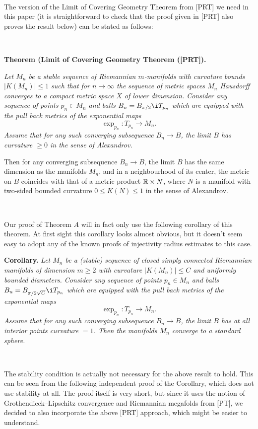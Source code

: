 \


 

The version of the Limit of Covering Geometry Theorem from [PRT] 
we need in this paper
(it is straightforward to check 
that the proof given in [PRT] also proves the result below)
can be stated as follows:
 
\ 
 
\noindent
{\bf Theorem (Limit of Covering Geometry Theorem ([PRT]).\ts} 
{\sl 
Let $M_n$ be a stable
sequence of Riemannian $m$-manifolds with curvature bounds $|K(M_n)|\le1$ such 
that for $n\to\infty$ the sequence of metric spaces $M_n$ Hausdorff converges
to 
a compact metric space $X$ of lower dimension.   
Consider any sequence of points 
$p_n\in M_n$ and balls $B_n=B_{\pi/2}\i T_{p_n}$ which are equipped with the 
pull back metrics of the exponential maps 
$$\exp_{p_n}\colon T_{p_n}\to M_n.$$   
Assume that for any such converging subsequence $B_n\to B$,  
the limit $B$ has curvature $\ge0$ in 
the sense of Alexandrov. 

Then for any converging subsequence $B_n\to B$, the limit $B$  
has the same dimension as the manifolds $M_n$, 
and in a neighbourhood of its center,  
the metric on $B$ coincides with that of 
a metric product ${\Bbb R}\times N$, where $N$ is a manifold with two-sided bounded 
curvature $0\le K(N)\le 1$ in the sense of Alexandrov. 
}

\ 

Our proof of Theorem $A$ will in fact only use the following corollary
of this theorem. At first sight this corollary looks almost obvious,
but it doesn't seem easy to adopt
any of the known proofs of injectivity radius estimates to this case.



\noindent
{\bf Corollary.\ts} 
{\sl Let $M_n$ be a (stable)
sequence of closed simply connected
Riemannian manifolds of dimension $m\ge2$ with curvature
$|K(M_n)|\le C$ and uniformly bounded diameters.   
Consider any sequence of points 
$p_n\in M_n$ and balls $B_n=B_{\pi/2\sqrt{C}}\i T_{p_n}$
which are equipped with the 
pull back metrics of the exponential maps 
$$\exp_{p_n}\colon T_{p_n}\to M_n.$$   
Assume that for any such converging subsequence $B_n\to B$,  
the limit $B$ has
at all interior points curvature $=1$.
Then the manifolds $M_n$ converge to a standard sphere.
}

\ 


The stability condition is actually not necessary for the above result
to hold.
This can be seen from the following
independent proof of the Corollary,
which does not use stability at all.
The proof itself is very short, but since it
uses the notion of
Grothendieck--Lipschitz convergence and Riemannian megafolds from [PT],
we decided to also incorporate the above [PRT] approach,
which might be easier to understand.


